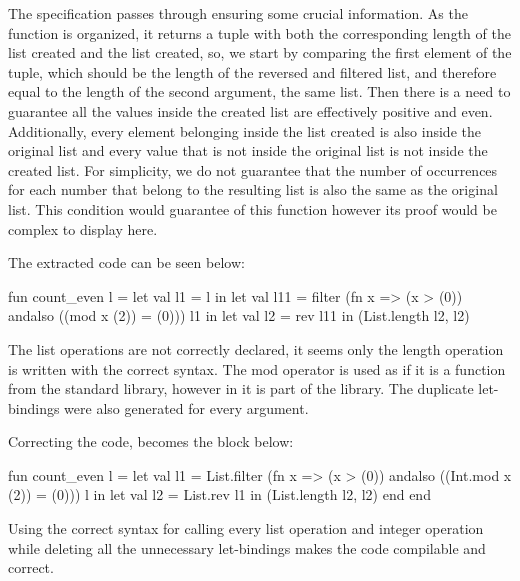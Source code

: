 The specification passes through ensuring some crucial information. As the function is organized, it returns a tuple with both the 
corresponding length of the list created and the list created, so, we start by comparing the first element of the tuple, which should 
be the length of the reversed and filtered list, and therefore equal to the length of the second argument, the same list. Then there is 
a need to guarantee all the values inside the created list are effectively positive and even. Additionally, every element belonging 
inside the list created is also inside the original list and every value that is not inside the original list is not inside the created 
list. For simplicity, we do not guarantee that the number of occurrences for each number that belong to the resulting list is also 
the same as the original list. This condition would guarantee of this function however its proof would be complex to display here.

The extracted code can be seen below:

\begin{cakeml}
fun count_even l =
  let val l1 = l in
  let val l11 = filter (fn x => (x > (0)) andalso ((mod x (2)) = (0))) l1 in
  let val l2 = rev l11 in (List.length l2, l2)
\end{cakeml}

The list operations are not correctly declared, it seems only the length operation is written with the correct syntax. The mod operator
is used as if it is a function from the standard library, however in \cml it is part of the  library. The duplicate 
let-bindings were also generated for every argument.

Correcting the code, becomes the block below:

\begin{cakeml}
fun count_even l =
  let val l1 = List.filter (fn x => (x > (0)) andalso ((Int.mod x (2)) = (0))) l in
  let val l2 = List.rev l1 in (List.length l2, l2) end end
\end{cakeml}

Using the correct syntax for calling every list operation and integer operation while deleting all the unnecessary let-bindings makes the
code compilable and correct.



